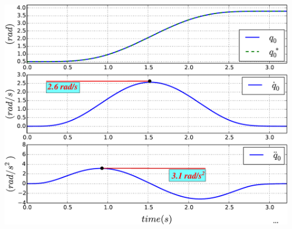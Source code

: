 \begin{frame}
\begin{columns}
\begin{columns}
\begin{center}
%
%
%

\end{center}

\column{.45\paperwidth}
\hspace{-5mm}
\vspace{5mm}
\includegraphics[width=0.98\columnwidth]{figures/No_constr_move.pdf}


\end{columns}
\end{columns}
\end{frame}
